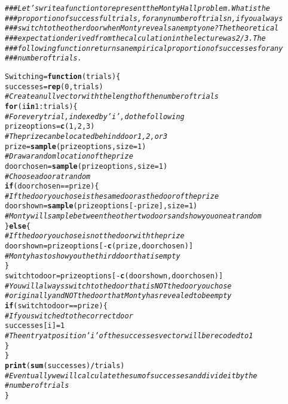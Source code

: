 \documentclass[12pt,letter]{article}\usepackage[]{graphicx}\usepackage[]{color}
\makeatletter
\newcommand{\hlnum}[1]{\textcolor[rgb]{0.686,0.059,0.569}{#1}}%
\newcommand{\hlcom}[1]{\textcolor[rgb]{0.678,0.584,0.686}{\textit{#1}}}%
\newcommand{\hlopt}[1]{\textcolor[rgb]{0,0,0}{#1}}%
\newcommand{\hlstd}[1]{\textcolor[rgb]{0.345,0.345,0.345}{#1}}%
\newcommand{\hlkwa}[1]{\textcolor[rgb]{0.161,0.373,0.58}{\textbf{#1}}}%
\newcommand{\hlkwb}[1]{\textcolor[rgb]{0.69,0.353,0.396}{#1}}%
\newcommand{\hlkwc}[1]{\textcolor[rgb]{0.333,0.667,0.333}{#1}}%
\newcommand{\hlkwd}[1]{\textcolor[rgb]{0.737,0.353,0.396}{\textbf{#1}}}%
\newenvironment{kframe}{%
 \def\at@end@of@kframe{}%
 \ifinner\ifhmode%
  \def\at@end@of@kframe{\end{minipage}}%
  \begin{minipage}{\columnwidth}%
 \fi\fi%
 \def\FrameCommand##1{\hskip\@totalleftmargin \hskip-\fboxsep
 \colorbox{shadecolor}{##1}\hskip-\fboxsep
     \hskip-\linewidth \hskip-\@totalleftmargin \hskip\columnwidth}%
 \MakeFramed {\advance\hsize-\width
   \@totalleftmargin\z@ \linewidth\hsize
   \@setminipage}}%
 {\par\unskip\endMakeFramed%
 \at@end@of@kframe}
\newenvironment{knitrout}{}{} %
\makeatother
\begin{document}
\begin{knitrout}
\color{fgcolor}\begin{kframe}
\begin{alltt}
\hlcom{### Let's write a function to represent the Monty Hall problem. What is the}
\hlcom{### proportion of successful trials, for any number of trials n, if you always}
\hlcom{### switch to the other door when Monty reveals an empty one? The theoretical}
\hlcom{### expectation derived from the calculation in the lecture was 2/3. The}
\hlcom{### following function returns an empirical proportion of successes for any}
\hlcom{### number of trials.}

\hlstd{Switching} \hlkwb{=} \hlkwa{function}\hlstd{(}\hlkwc{trials}\hlstd{) \{}
    \hlstd{successes} \hlkwb{=} \hlkwd{rep}\hlstd{(}\hlnum{0}\hlstd{, trials)}
    \hlcom{# Create a null vector with the length of the number of trials}
    \hlkwa{for} \hlstd{(i} \hlkwa{in} \hlnum{1}\hlopt{:}\hlstd{trials) \{}
        \hlcom{# For every trial, indexed by 'i', do the following}
        \hlstd{prizeoptions} \hlkwb{=} \hlkwd{c}\hlstd{(}\hlnum{1}\hlstd{,} \hlnum{2}\hlstd{,} \hlnum{3}\hlstd{)}
        \hlcom{# The prize can be located behind door 1, 2, or 3}
        \hlstd{prize} \hlkwb{=} \hlkwd{sample}\hlstd{(prizeoptions,} \hlkwc{size} \hlstd{=} \hlnum{1}\hlstd{)}
        \hlcom{# Draw a random location of the prize}
        \hlstd{doorchosen} \hlkwb{=} \hlkwd{sample}\hlstd{(prizeoptions,} \hlkwc{size} \hlstd{=} \hlnum{1}\hlstd{)}
        \hlcom{# Choose a door at random}
        \hlkwa{if} \hlstd{(doorchosen} \hlopt{==} \hlstd{prize) \{}
            \hlcom{# If the door you chose is the same door as the door of the prize}
            \hlstd{doorshown} \hlkwb{=} \hlkwd{sample}\hlstd{(prizeoptions[}\hlopt{-}\hlstd{prize],} \hlkwc{size} \hlstd{=} \hlnum{1}\hlstd{)}
            \hlcom{# Monty will sample between the other two doors and show you one at random}
        \hlstd{\}} \hlkwa{else} \hlstd{\{}
            \hlcom{# If the door you chose is not the door with the prize}
            \hlstd{doorshown} \hlkwb{=} \hlstd{prizeoptions[}\hlopt{-}\hlkwd{c}\hlstd{(prize, doorchosen)]}
            \hlcom{# Monty has to show you the third door that is empty}
        \hlstd{\}}
        \hlstd{switchtodoor} \hlkwb{=} \hlstd{prizeoptions[}\hlopt{-}\hlkwd{c}\hlstd{(doorshown, doorchosen)]}
        \hlcom{# You will always switch to the door that is NOT the door you chose}
        \hlcom{# originally and NOT the door that Monty has revealed to be empty}
        \hlkwa{if} \hlstd{(switchtodoor} \hlopt{==} \hlstd{prize) \{}
            \hlcom{# If you switched to the correct door}
            \hlstd{successes[i]} \hlkwb{=} \hlnum{1}
            \hlcom{# The entry at position 'i' of the successes vector will be recoded to 1}
        \hlstd{\}}
    \hlstd{\}}
    \hlkwd{print}\hlstd{(}\hlkwd{sum}\hlstd{(successes)}\hlopt{/}\hlstd{trials)}
    \hlcom{# Eventually we will calculate the sum of successes and divide it by the}
    \hlcom{# number of trials}
\hlstd{\}}


\end{alltt}
\end{kframe}
\end{knitrout}
\end{document}
